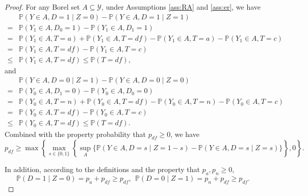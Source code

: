 \documentclass[12pt]{article}
\theoremstyle{plain}
\theoremstyle{definition}
\theoremstyle{remark}
\begin{document}
\begin{proof}
For any Borel set $A \subseteq \mathcal{Y}$, under Assumptions \ref{ass:RA} and \ref{ass:er}, we have
\begin{equation*}
    \begin{aligned}
        & \mathbb{P}\left(Y \in A, D = 1 \mid Z = 0\right) - \mathbb{P}\left(Y \in A, D = 1 \mid Z = 1\right) \\
        =& \mathbb{P}\left(Y_1 \in A, D_0 = 1\right) - \mathbb{P}\left(Y_1 \in A, D_1 = 1\right) \\
        =& \mathbb{P}\left(Y_1 \in A, T = a\right) + \mathbb{P}\left(Y_1 \in A, T = df\right) - \mathbb{P}\left(Y_1 \in A, T = a\right) - \mathbb{P}\left(Y_1 \in A, T = c\right) \\
        =& \mathbb{P}\left(Y_1 \in A, T = df\right) - \mathbb{P}\left(Y_1 \in A, T = c\right) \\
        \leq& \mathbb{P}\left(Y_1 \in A, T = df\right) \leq \mathbb{P}\left(T = df\right),
    \end{aligned}
\end{equation*}
and 
\begin{equation*}
    \begin{aligned}
        & \mathbb{P}\left(Y \in A, D = 0 \mid Z = 1\right) - \mathbb{P}\left(Y \in A, D = 0 \mid Z = 0\right) \\
        =& \mathbb{P}\left(Y_0 \in A, D_1 = 0\right) - \mathbb{P}\left(Y_0 \in A, D_0 = 0\right) \\
        =& \mathbb{P}\left(Y_0 \in A, T = n\right) + \mathbb{P}\left(Y_0 \in A, T = df\right) - \mathbb{P}\left(Y_0 \in A, T = n\right) - \mathbb{P}\left(Y_0 \in A, T = c\right) \\
        =& \mathbb{P}\left(Y_0 \in A, T = df\right) - \mathbb{P}\left(Y_0 \in A, T = c\right) \\
        \leq& \mathbb{P}\left(Y_0 \in A, T = df\right) \leq \mathbb{P}\left(T = df\right).
    \end{aligned}
\end{equation*}
Combined with the property probability that $p_{df} \geq 0$, we have 
\begin{equation*}
    p_{df} \geq \max \left\{\max _{s \in\{0,1\}}\left\{\sup _A\{\mathbb{P}(Y \in A, D=s \mid Z=1-s)-\mathbb{P}(Y \in A, D=s \mid Z=s)\}\right\}, 0\right\}.
\end{equation*}

In addition, according to the definitions and the property that $p_a, p_n \geq 0$,
\begin{equation*}
    \mathbb{P}\left(D = 1 \mid Z = 0\right) = p_a + p_{df} \geq p_{df}, \ \ \mathbb{P}\left(D = 0 \mid Z = 1\right) = p_n + p_{df} \geq p_{df}.
\end{equation*}


\end{proof}
\end{document}
